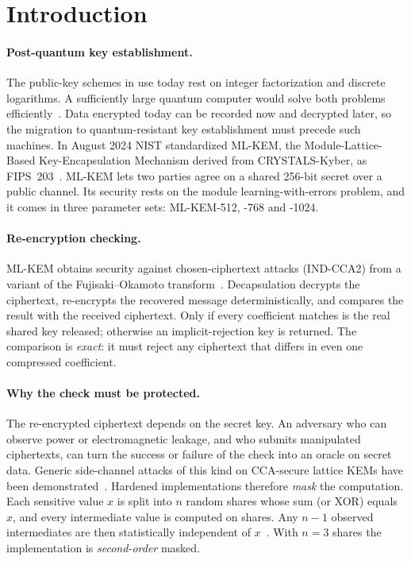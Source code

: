 \section{Introduction}\label{sec:intro}

\paragraph{Post-quantum key establishment.}
The public-key schemes in use today rest on integer factorization and discrete logarithms. A sufficiently large quantum computer would solve both problems efficiently~\cite{shor1997}. Data encrypted today can be recorded now and decrypted later, so the migration to quantum-resistant key establishment must precede such machines. In August 2024 NIST standardized ML-KEM, the Module-Lattice-Based Key-Encapsulation Mechanism derived from CRYSTALS-Kyber, as FIPS~203~\cite{fips203,bos2018kyber}. ML-KEM lets two parties agree on a shared 256-bit secret over a public channel. Its security rests on the module learning-with-errors problem, and it comes in three parameter sets: ML-KEM-512, -768 and -1024.

\paragraph{Re-encryption checking.}
ML-KEM obtains security against chosen-ciphertext attacks (IND-CCA2) from a variant of the Fujisaki--Okamoto transform~\cite{fujisaki1999,hofheinz2017}. Decapsulation decrypts the ciphertext, re-encrypts the recovered message deterministically, and compares the result with the received ciphertext. Only if every coefficient matches is the real shared key released; otherwise an implicit-rejection key is returned. The comparison is \emph{exact}: it must reject any ciphertext that differs in even one compressed coefficient.

\paragraph{Why the check must be protected.}
The re-encrypted ciphertext depends on the secret key. An adversary who can observe power or electromagnetic leakage, and who submits manipulated ciphertexts, can turn the success or failure of the check into an oracle on secret data. Generic side-channel attacks of this kind on CCA-secure lattice KEMs have been demonstrated~\cite{ravi2020}. Hardened implementations therefore \emph{mask} the computation. Each sensitive value $x$ is split into $n$ random shares whose sum (or XOR) equals $x$, and every intermediate value is computed on shares. Any $n-1$ observed intermediates are then statistically independent of $x$~\cite{ishai2003}. With $n = 3$ shares the implementation is \emph{second-order} masked.

